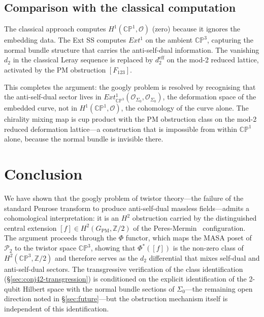 \documentclass[11pt,a4paper]{article}
\theoremstyle{remark}
\newcommand{\CP}{\mathbb{CP}}
\newcommand{\Z}{\mathbb{Z}}
\newcommand{\cO}{\mathcal{O}}
\newcommand{\PP}{\mathcal{P}}
\begin{document}
\subsection*{Comparison with the classical computation}

The classical approach computes $H^1(\CP^1, \cO)$ (zero) because
it ignores the embedding data. The Ext SS computes $Ext^1$ on
the ambient $\CP^3$, capturing the normal bundle structure that
carries the anti-self-dual information. The vanishing $d_2$ in
the classical Leray sequence is replaced by $d_2^{\text{eff}}$ on
the mod-2 reduced lattice, activated by the PM obstruction
$[F_{123}]$.

This completes the argument: the googly problem is resolved by
recognising that the anti-self-dual sector lives in
$Ext^1_{\CP^3}(\mathcal{O}_{\Sigma_0}, \mathcal{O}_{\Sigma_0})$,
the deformation space of the embedded curve, not in
$H^1(\CP^1, \cO)$, the cohomology of the curve alone.
The chirality mixing map is cup product with the PM obstruction
class on the mod-2 reduced deformation lattice---a construction
that is impossible from within $\CP^1$ alone, because the
normal bundle is invisible there.

\section{Conclusion}
\label{sec:conclusion}

We have shown that the googly problem of twistor theory---the failure
of the standard Penrose transform to produce anti-self-dual
massless fields---admits a cohomological interpretation: it is
an $H^2$ obstruction carried by the distinguished central extension
$[f] \in H^2(G_{\text{PM}}, \Z/2)$ of the Peres-Mermin~\cite{PeresMermin} configuration.
The argument proceeds through the $\Phi$ functor, which maps the
MASA poset of $\PP_2$ to the twistor space $\CP^3$, showing that
$\Phi^*([f])$ is the non-zero class of $H^2(\CP^3, \Z/2)$ and
therefore serves as the $d_2$ differential that mixes self-dual
and anti-self-dual sectors.  The transgressive verification of the
class identification (\S\ref{sec:conj42-transgression}) is conditioned
on the explicit identification of the 2-qubit Hilbert space with the
normal bundle sections of $\Sigma_0$---the remaining open direction
noted in \S\ref{sec:future}---but the obstruction mechanism itself
is independent of this identification.
\end{document}
